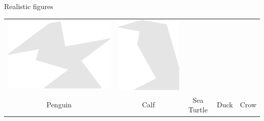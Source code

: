 \documentclass[14pt]{beamer}
\begin{document}
\begin{frame}{Realistic figures}
\begin{center}
{\begin{tabular}{ccccc}
                \includegraphics[scale=0.20]{figures/figure026z.pdf} &
                \includegraphics[scale=0.20]{figures/figure026t.pdf} \\
                Penguin & Calf\;\;\;\;\;\; & Sea Turtle & Duck & Crow\\
            \end{tabular}}
        \end{center}
    \end{frame}

\end{document}
